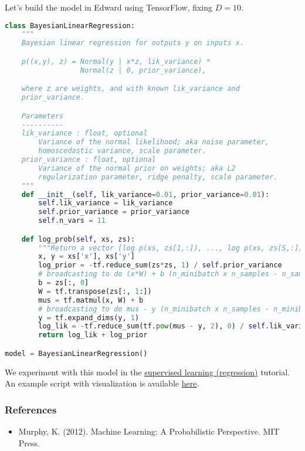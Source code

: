Let's build the model in Edward using TensorFlow, fixing $D=10$.
\begin{lstlisting}[language=Python]
class BayesianLinearRegression:
    """
    Bayesian linear regression for outputs y on inputs x.

    p((x,y), z) = Normal(y | x*z, lik_variance) *
                  Normal(z | 0, prior_variance),

    where z are weights, and with known lik_variance and
    prior_variance.

    Parameters
    ----------
    lik_variance : float, optional
        Variance of the normal likelihood; aka noise parameter,
        homoscedastic variance, scale parameter.
    prior_variance : float, optional
        Variance of the normal prior on weights; aka L2
        regularization parameter, ridge penalty, scale parameter.
    """
    def __init__(self, lik_variance=0.01, prior_variance=0.01):
        self.lik_variance = lik_variance
        self.prior_variance = prior_variance
        self.n_vars = 11

    def log_prob(self, xs, zs):
        """Return a vector [log p(xs, zs[1,:]), ..., log p(xs, zs[S,:])]."""
        x, y = xs['x'], xs['y']
        log_prior = -tf.reduce_sum(zs*zs, 1) / self.prior_variance
        # broadcasting to do (x*W) + b (n_minibatch x n_samples - n_samples)
        b = zs[:, 0]
        W = tf.transpose(zs[:, 1:])
        mus = tf.matmul(x, W) + b
        # broadcasting to do mus - y (n_minibatch x n_samples - n_minibatch x 1)
        y = tf.expand_dims(y, 1)
        log_lik = -tf.reduce_sum(tf.pow(mus - y, 2), 0) / self.lik_variance
        return log_lik + log_prior

model = BayesianLinearRegression()
\end{lstlisting}

We experiment with this model in the \href{tut_supervised_regression.html}{supervised
learning (regression)} tutorial.
An example script with visualization is available
\href{https://github.com/blei-lab/edward/blob/master/examples/bayesian_linear_regression_plot.py}
{here}.

\subsubsection{References}\label{references}

\begin{itemize}
\item
  Murphy, K. (2012). Machine Learning: A Probabilistic Perspective. MIT Press.
\end{itemize}
